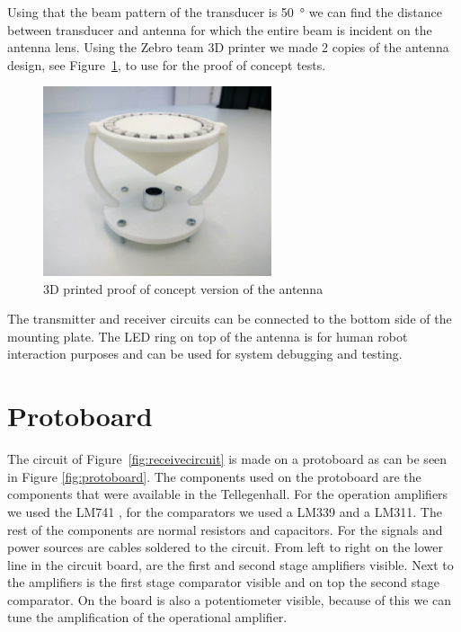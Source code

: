 Using that the beam pattern of the transducer is \SI{50}{\degree} we can find the distance between transducer and antenna for which the entire beam is incident on the antenna lens. Using the Zebro team 3D printer we made 2 copies of the antenna design, see Figure~\ref{fig:3D_ant}, to use for the proof of concept tests.

\begin{figure}[H]
\centering
\includegraphics[width=0.6\textwidth]{Figures/3D_ant.jpeg}
\caption{3D printed proof of concept version of the antenna}\label{fig:3D_ant}
\end{figure}

The transmitter and receiver circuits can be connected to the bottom side of the mounting plate. The LED ring on top of the antenna is for human robot interaction purposes and can be used for system debugging and testing.


\section{Protoboard}

The circuit of Figure~\ref{fig:receivecircuit} is made on a protoboard as can be seen in Figure \ref{fig:protoboard}. The components used on the protoboard are the components that were available in the Tellegenhall. For the operation amplifiers we used the LM741 \cite{LM741}
, for the comparators we used a LM339 and  a LM311. The rest of the components are normal resistors and capacitors. For the signals and power sources are cables soldered to the circuit. From left to right on the lower line in the circuit board, are the first and second stage amplifiers visible. Next to the amplifiers is the first stage comparator visible and on top the second stage comparator. On the board is also a potentiometer visible, because of this we can tune the amplification of the operational amplifier.



